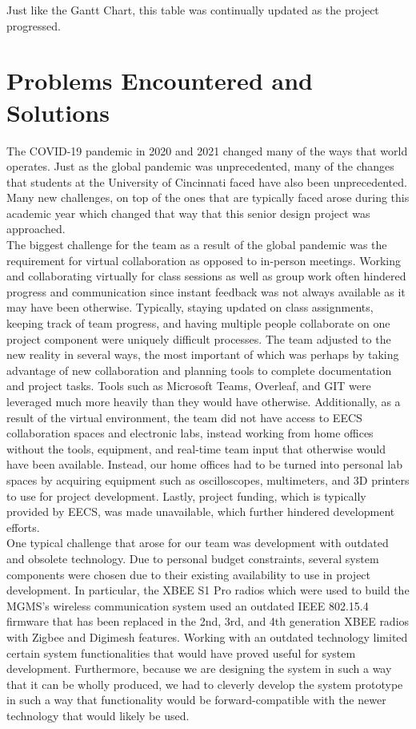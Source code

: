 \documentclass{report}
\begin{document}
Just like the Gantt Chart, this table was continually updated as the project progressed.

\section{Problems Encountered and Solutions}

The COVID-19 pandemic in 2020 and 2021 changed many of the ways that world operates. Just as the global pandemic was unprecedented, many of the changes that students at the University of Cincinnati faced have also been unprecedented. Many new challenges, on top of the ones that are typically faced arose during this academic year which changed that way that this senior design project was approached.\\

The biggest challenge for the team as a result of the global pandemic was the requirement for virtual collaboration as opposed to in-person meetings. Working and collaborating virtually for class sessions as well as group work often hindered progress and communication since instant feedback was not always available as it may have been otherwise. Typically, staying updated on class assignments, keeping track of team progress, and having multiple people collaborate on one project component were uniquely difficult processes. The team adjusted to the new reality in several ways, the most important of which was perhaps by taking advantage of new collaboration and planning tools to complete documentation and project tasks. Tools such as Microsoft Teams, Overleaf, and GIT were leveraged much more heavily than they would have otherwise. Additionally, as a result of the virtual environment, the team did not have access to EECS collaboration spaces and electronic labs, instead working from home offices without the tools, equipment, and real-time team input that otherwise would have been available. Instead, our home offices had to be turned into personal lab spaces by acquiring equipment such as oscilloscopes, multimeters, and 3D printers to use for project development. Lastly, project funding, which is typically provided by EECS, was made unavailable, which further hindered development efforts.\\

One typical challenge that arose for our team was development with outdated and obsolete technology. Due to personal budget constraints, several system components were chosen due to their existing availability to use in project development. In particular, the XBEE S1 Pro radios which were used to build the MGMS's wireless communication system used an outdated IEEE 802.15.4 firmware that has been replaced in the 2nd, 3rd, and 4th generation XBEE radios with Zigbee and Digimesh features. Working with an outdated technology limited certain system functionalities that would have proved useful for system development. Furthermore, because we are designing the system in such a way that it can be wholly produced, we had to cleverly develop the system prototype in such a way that functionality would be forward-compatible with the newer technology that would likely be used.
\end{document}
